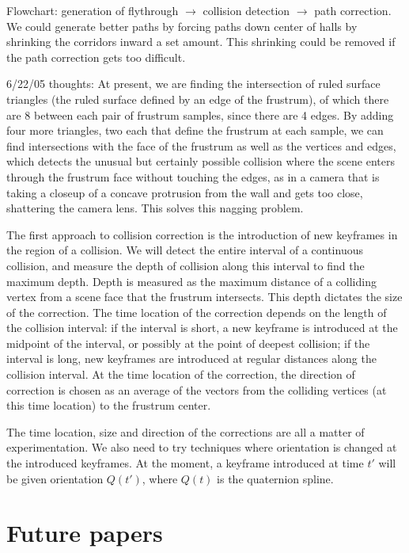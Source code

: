 \documentclass[12pt]{article}
\begin{document}
Flowchart: generation of flythrough $\rightarrow$ collision detection $\rightarrow$ 
path correction.
We could generate better paths by forcing paths down center of halls by shrinking
the corridors inward a set amount.  This shrinking could be removed if the path
correction gets too difficult.

6/22/05 thoughts:
At present, we are finding the intersection of ruled surface triangles 
(the ruled surface defined by an edge of the frustrum), of which there are 8 between each pair
of frustrum samples, since there are 4 edges.
By adding four more triangles, two each that define the frustrum at each sample, we can find
intersections with the face of the frustrum as well as the vertices and edges, which detects
the unusual but certainly possible 
collision where the scene enters through the frustrum face without touching the edges, as
in a camera that is taking a closeup of a concave protrusion from the wall and gets too close,
shattering the camera lens.  This solves this nagging problem.

The first approach to collision correction is the introduction of new keyframes in the 
region of a collision.
We will detect the entire interval of a continuous collision, 
and measure the depth of collision along this interval to find the maximum depth.
Depth is measured as the maximum distance of a colliding vertex from a scene face that the
frustrum intersects.
This depth dictates the size of the correction.
The time location of the correction depends on the length of the collision interval:
if the interval is short, a new keyframe is introduced at the midpoint of the interval,
or possibly at the point of deepest collision;
if the interval is long, new keyframes are introduced at regular distances along the 
collision interval.
At the time location of the correction, the direction of correction is chosen as an 
average of the vectors from the colliding vertices (at this time location) to the frustrum center.

The time location, size and direction of the corrections are all a matter of experimentation.
We also need to try techniques where orientation is changed at the introduced keyframes.
At the moment, a keyframe introduced at time $t'$ will be given orientation $Q(t')$,
where $Q(t)$ is the quaternion spline.

\section{Future papers}
\end{document}
